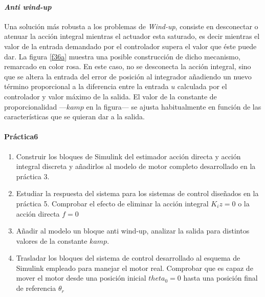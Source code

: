 \documentclass[10pt,a4paper]{report}
\begin{document}
\paragraph{\emph{Anti wind-up}}
Una solución más robusta a los problemas de \emph{Wind-up}, consiste en desconectar o atenuar la acción integral mientras el actuador esta saturado, es decir mientras el valor de la entrada demandado por el controlador supera el valor que éste puede dar. La figura \ref{f36a} muestra una posible construcción de dicho mecanismo, remarcado en color rosa. En este caso, no se desconecta la acción integral, sino que se altera la entrada del error de posición al integrador añadiendo un nuevo término proporcional a la diferencia entre la entrada $u$ calculada por el controlador y valor máximo de la salida. El valor de la constante de proporcionalidad ---$kamp$ en la figura--- se ajusta habitualmente en función de las características que se quieran dar a la salida. 

\paragraph{Práctica6}
\begin{enumerate}
\item  Construir los bloques de Simulink del estimador acción directa y  acción integral discreta y añadirlos al modelo de motor completo desarrollado en la práctica 3.
 \item Estudiar la respuesta del sistema para los sistemas de control diseñados en la práctica 5. Comprobar el efecto de eliminar la acción integral $K_iz=0$ o la acción directa $f=0$
 \item Añadir al modelo un bloque anti wind-up, analizar la salida para distintos valores de la constante $kamp$.
\item Trasladar los bloques del sistema de control desarrollado al esquema de Simulink empleado para manejar el motor real. Comprobar que es capaz de mover el motor desde una posición inicial $theta_0 = 0$ hasta una posición final de referencia $\theta_r$
\end{enumerate}



{}
\end{document}
